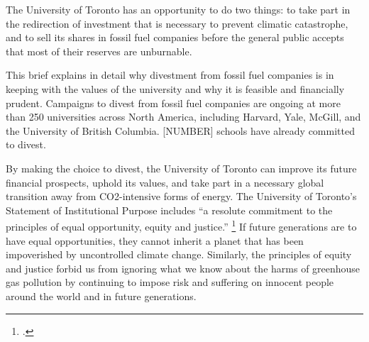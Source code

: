 The University of Toronto has an opportunity to do two things: to take part in the redirection of investment that is necessary to prevent climatic catastrophe, and to sell its shares in fossil fuel companies before the general public accepts that most of their reserves are unburnable.



This brief explains in detail why divestment from fossil fuel companies is in keeping with the values of the university and why it is feasible and financially prudent.
Campaigns to divest from fossil fuel companies are ongoing at more than 250 universities across North America, including Harvard, Yale, McGill, and the University of British Columbia.
[NUMBER] schools have already committed to divest.



By making the choice to divest, the University of Toronto can improve its future financial prospects, uphold its values, and take part in a necessary global transition away from CO2-intensive forms of energy.
The University of Toronto's Statement of Institutional Purpose includes ``a resolute commitment to the principles of equal opportunity, equity and justice.'' \footcite{InstitutionalPurpose}
If future generations are to have equal opportunities, they cannot inherit a planet that has been impoverished by uncontrolled climate change.
Similarly, the principles of equity and justice forbid us from ignoring what we know about the harms of greenhouse gas pollution by continuing to impose risk and suffering on innocent people around the world and in future generations.



